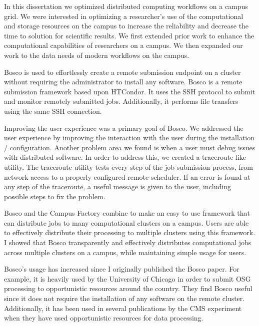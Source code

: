 \label{chapter:coordinatingstorage}

In this dissertation we optimized distributed computing workflows on a campus grid.  We were interested in optimizing a researcher's use of the computational and storage resources on the campus to increase the reliability and decrease the time to solution for scientific results.  We first extended prior work to enhance the computational capabilities of researchers on a campus.  We then expanded our work to the data needs of modern workflows on the campus.

Bosco is used to effortlessly create a remote submission endpoint on a cluster without requiring the administrator to install any software.  Bosco is a remote submission framework based upon HTCondor.  It uses the SSH protocol to submit and monitor remotely submitted jobs.  Additionally, it performs file transfers using the same SSH connection.

Improving the user experience was a primary goal of Bosco.  We addressed the user experience by improving the interaction with the user during the installation / configuration.  Another problem area we found is when a user must debug issues with distributed software.  In order to address this, we created a traceroute like utility.  The traceroute utility tests every step of the job submission process, from network access to a properly configured remote scheduler.  If an error is found at any step of the traceroute, a useful message is given to the user, including possible steps to fix the problem.

Bosco and the Campus Factory combine to make an easy to use framework that can distribute jobs to many computational clusters on a campus.  Users are able to effectively distribute their processing to multiple clusters using this framework.  I showed that Bosco transparently and effectively distributes computational jobs across multiple clusters on a campus, while maintaining simple usage for users.

Bosco's usage has increased since I originally published the Bosco paper.  For example, it is heavily used by the University of Chicago in order to submit OSG processing to opportunistic resources around the country.  They find Bosco useful since it does not require the installation of any software on the remote cluster.  Additionally, it has been used in several publications by the CMS experiment when they have used opportunistic resources for data processing.

